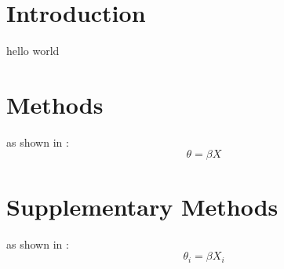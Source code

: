 \documentclass{ms}
\begin{document}
  
  \maketitle
  \section{Introduction}
  hello world
  \section{Methods}
  as shown in \cite{Last2001}:
  \begin{equation} \theta = \beta X \end{equation}
  \printbibliography
  \appendix
  \section{Supplementary Methods}
  as shown in \cite{Last2002}:
  \begin{equation} \theta_i = \beta X_i \end{equation}
  \printbibliography
\end{document}
